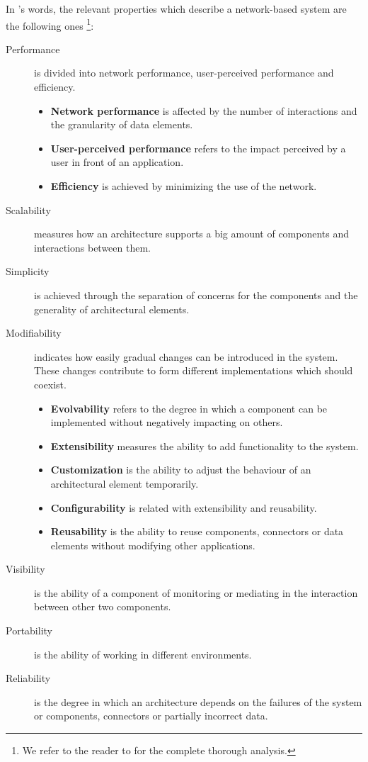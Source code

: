 In \citeauthor{fielding_architectural_2000}'s words, the relevant properties which describe a network-based system are the following ones \footnote{We refer to the reader to \citet{fielding_architectural_2000} for the complete thorough analysis.}:
\begin{description}
  \item[Performance] is divided into network performance, user-perceived performance and efficiency.
    \begin{itemize}
      \item \textbf{Network performance} is affected by the number of interactions and the granularity of data elements.
      \item \textbf{User-perceived performance} refers to the impact perceived by a user in front of an application. %
      \item \textbf{Efficiency} is achieved by minimizing the use of the network.
    \end{itemize}
  \item[Scalability] measures how an architecture supports a big amount of components and interactions between them.
  \item[Simplicity] is achieved through the separation of concerns for the components and the generality of architectural elements.
  \item[Modifiability] indicates how easily gradual changes can be introduced in the system.
                       These changes contribute to form different implementations which should coexist.
    \begin{itemize}
      \item \textbf{Evolvability} refers to the degree in which a component can be implemented without negatively impacting on others.
      \item \textbf{Extensibility} measures the ability to add functionality to the system.
      \item \textbf{Customization} is the ability to adjust the behaviour of an architectural element temporarily.
      \item \textbf{Configurability} is related with extensibility and reusability.
      \item \textbf{Reusability} is the ability to reuse components, connectors or data elements without modifying other applications.
    \end{itemize}
  \item[Visibility] is the ability of a component of monitoring or mediating in the interaction between other two components.
  \item[Portability] is the ability of working in different environments.
  \item[Reliability] is the degree in which an architecture depends on the failures of the system or components, connectors or partially incorrect data.
\end{description}

